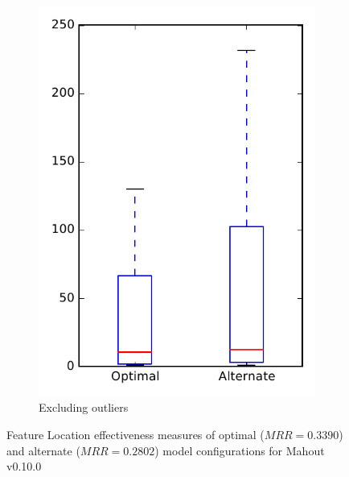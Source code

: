\begin{figure}
\begin{subfigure}{.4\textwidth}
        \includegraphics[height=0.4\textheight]{figures/combo/flt_rq1_mahout_no_outlier}
        \caption{Excluding outliers}\label{fig:combo:flt:rq1:mahout_no_outlier}
    \end{subfigure}
\caption[Feature Location effectiveness measures of optimal and alternate model configurations for Mahout v0.10.0]%
{Feature Location effectiveness measures of optimal ($MRR=0.3390$) and alternate ($MRR=0.2802$) model configurations for Mahout v0.10.0}
\label{fig:combo:flt:rq1:mahout}
\end{figure}
